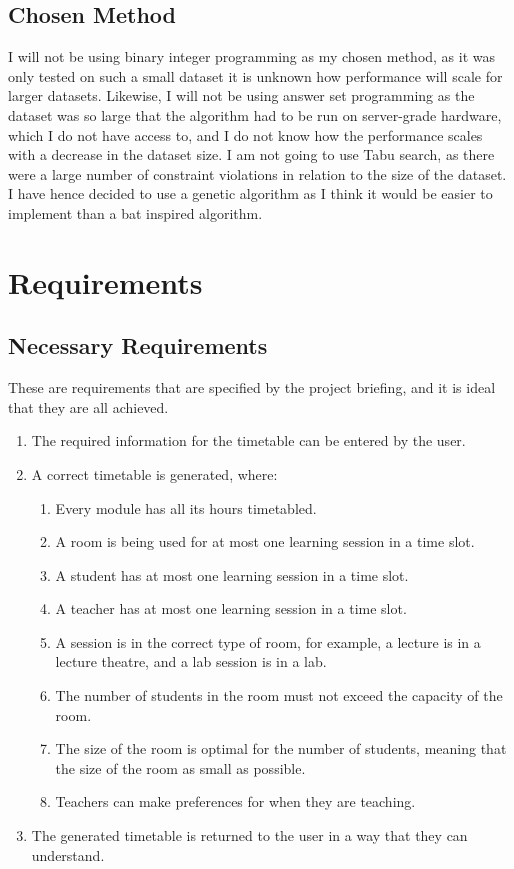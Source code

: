 \documentclass[a4paper, 12pt]{report}
\begin{document}
\newpage

\section{Chosen Method}

I will not be using binary integer programming as my chosen method, as it was 
only tested on such a small dataset it is unknown how performance will scale for
larger datasets.
Likewise, I will not be using answer set programming as the dataset was so large
that the algorithm had to be run on server-grade hardware, which I do not have 
access to, and I do not know how the performance scales with a decrease in the 
dataset size.
I am not going to use Tabu search, as there were a large number of constraint 
violations in relation to the size of the dataset.
I have hence decided to use a genetic algorithm as I think it would be easier to
implement than a bat inspired algorithm.

\chapter{Requirements}

\section{Necessary Requirements}

These are requirements that are specified by the project briefing, and it is
ideal that they are all achieved.
\begin{enumerate}
	\item The required information for the timetable can be entered by the user.
	\item A correct timetable is generated, where:
	\begin{enumerate}
		\item Every module has all its hours timetabled.
		\item A room is being used for at most one learning session in a time 
			slot.
		\item A student has at most one learning session in a time slot.
		\item A teacher has at most one learning session in a time slot.
		\item A session is in the correct type of room, for example, a lecture
			is in a lecture theatre, and a lab session is in a lab.
		\item The number of students in the room must not exceed the capacity of
			the room.
		\item The size of the room is optimal for the number of students,
			meaning that the size of the room as small as possible.
		\item Teachers can make preferences for when they are teaching.
	\end{enumerate}
	\item The generated timetable is returned to the user in a way that they can
		understand.
\end{enumerate}
\end{document}
